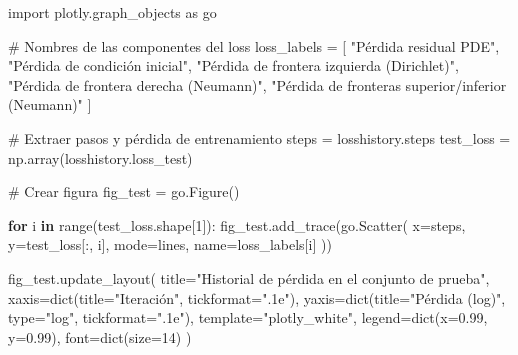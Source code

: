 \documentclass[
  spanish,
  us-letterpaper,
  DIV=11,
  numbers=noendperiod]{scrreprt}
\newenvironment{Shaded}{\begin{snugshade}}{\end{snugshade}}
\newcommand{\BuiltInTok}[1]{\textcolor[rgb]{0.00,0.23,0.31}{#1}}
\newcommand{\CommentTok}[1]{\textcolor[rgb]{0.37,0.37,0.37}{#1}}
\newcommand{\ControlFlowTok}[1]{\textcolor[rgb]{0.00,0.23,0.31}{\textbf{#1}}}
\newcommand{\DecValTok}[1]{\textcolor[rgb]{0.68,0.00,0.00}{#1}}
\newcommand{\FloatTok}[1]{\textcolor[rgb]{0.68,0.00,0.00}{#1}}
\newcommand{\ImportTok}[1]{\textcolor[rgb]{0.00,0.46,0.62}{#1}}
\newcommand{\KeywordTok}[1]{\textcolor[rgb]{0.00,0.23,0.31}{\textbf{#1}}}
\newcommand{\NormalTok}[1]{\textcolor[rgb]{0.00,0.23,0.31}{#1}}
\newcommand{\OperatorTok}[1]{\textcolor[rgb]{0.37,0.37,0.37}{#1}}
\newcommand{\StringTok}[1]{\textcolor[rgb]{0.13,0.47,0.30}{#1}}
\theoremstyle{plain}
\theoremstyle{definition}
\theoremstyle{remark}
\begin{document}
\begin{Shaded}
\begin{Highlighting}[]
\ImportTok{import}\NormalTok{ plotly.graph\_objects }\ImportTok{as}\NormalTok{ go}

\CommentTok{\# Nombres de las componentes del loss}
\NormalTok{loss\_labels }\OperatorTok{=}\NormalTok{ [}
    \StringTok{"Pérdida residual PDE"}\NormalTok{,}
    \StringTok{"Pérdida de condición inicial"}\NormalTok{,}
    \StringTok{"Pérdida de frontera izquierda (Dirichlet)"}\NormalTok{,}
    \StringTok{"Pérdida de frontera derecha (Neumann)"}\NormalTok{,}
    \StringTok{"Pérdida de fronteras superior/inferior (Neumann)"}
\NormalTok{]}

\CommentTok{\# Extraer pasos y pérdida de entrenamiento}
\NormalTok{steps }\OperatorTok{=}\NormalTok{ losshistory.steps}
\NormalTok{test\_loss }\OperatorTok{=}\NormalTok{ np.array(losshistory.loss\_test)}

\CommentTok{\# Crear figura}
\NormalTok{fig\_test }\OperatorTok{=}\NormalTok{ go.Figure()}

\ControlFlowTok{for}\NormalTok{ i }\KeywordTok{in} \BuiltInTok{range}\NormalTok{(test\_loss.shape[}\DecValTok{1}\NormalTok{]):}
\NormalTok{    fig\_test.add\_trace(go.Scatter(}
\NormalTok{        x}\OperatorTok{=}\NormalTok{steps,}
\NormalTok{        y}\OperatorTok{=}\NormalTok{test\_loss[:, i],}
\NormalTok{        mode}\OperatorTok{=}\StringTok{\textquotesingle{}lines\textquotesingle{}}\NormalTok{,}
\NormalTok{        name}\OperatorTok{=}\NormalTok{loss\_labels[i]}
\NormalTok{    ))}

\NormalTok{fig\_test.update\_layout(}
\NormalTok{    title}\OperatorTok{=}\StringTok{"Historial de pérdida en el conjunto de prueba"}\NormalTok{,}
\NormalTok{    xaxis}\OperatorTok{=}\BuiltInTok{dict}\NormalTok{(title}\OperatorTok{=}\StringTok{"Iteración"}\NormalTok{, tickformat}\OperatorTok{=}\StringTok{".1e"}\NormalTok{),}
\NormalTok{    yaxis}\OperatorTok{=}\BuiltInTok{dict}\NormalTok{(title}\OperatorTok{=}\StringTok{"Pérdida (log)"}\NormalTok{, }\BuiltInTok{type}\OperatorTok{=}\StringTok{"log"}\NormalTok{, tickformat}\OperatorTok{=}\StringTok{".1e"}\NormalTok{),}
\NormalTok{    template}\OperatorTok{=}\StringTok{"plotly\_white"}\NormalTok{,}
\NormalTok{    legend}\OperatorTok{=}\BuiltInTok{dict}\NormalTok{(x}\OperatorTok{=}\FloatTok{0.99}\NormalTok{, y}\OperatorTok{=}\FloatTok{0.99}\NormalTok{),}
\NormalTok{    font}\OperatorTok{=}\BuiltInTok{dict}\NormalTok{(size}\OperatorTok{=}\DecValTok{14}\NormalTok{)}
\NormalTok{)}
\end{Highlighting}
\end{Shaded}
\end{document}
